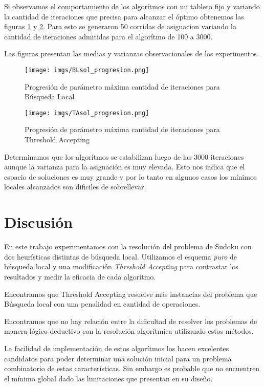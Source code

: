 \documentclass[a4paper,spanish]{article}
\begin{document}
Si observamos el comportamiento de los algorítmos con un tablero fijo y variando
la cantidad de iteraciones que precisa para alcanzar el óptimo obtenemos las
figuras \ref{img:prog_ls} y \ref{img:prog_ta}. Para esto se generaron 50
corridas de asignacion variando la cantidad de iteraciones admitidas para el
algorítmo de 100 a 3000.

Las figuras presentan las medias y varianzas observacionales de los
experimentos.


\begin{center}
    \begin{figure}[H]
        \texttt{[image: imgs/BLsol\_progresion.png]}
        \caption{Progresión de parámetro máxima cantidad de iteraciones para Búsqueda Local}
        \label{img:prog_ls}
    \end{figure}
\end{center}


\begin{center}
    \begin{figure}[H]
        \texttt{[image: imgs/TAsol\_progresion.png]}
        \caption{Progresión de parámetro máxima cantidad de iteraciones para
        Threshold Accepting}
        \label{img:prog_ta}
    \end{figure}
\end{center}

Determinamos que los algorítmos se estabilizan luego de las 3000 iteraciones
aunque la varianza para la asignación es muy elevada. Esto nos indica que el
espacio de soluciones es muy grande y por lo tanto en algunos casos los mínimos locales
alcanzados son dificiles de sobrellevar.



\section{Discusión}

En este trabajo experimentamos con la resolución del problema de Sudoku con dos
heurísticas distintas de búsqueda local. Utilizamos el esquema \textit{puro} de
búsqueda local y una modificación \emph{Threshold Accepting} para contrastar los
resultados y medir la eficacia de cada algorítmo.

Encontramos que Threshold Accepting resuelve más instancias del problema que
Búsqueda local con una penalidad en cantidad de operaciones.

Encontramos que no hay relación entre la dificultad de resolver los problemas de
manera lógico deductivo con la resolución algorítmica utilizando estos métodos.

La facilidad de implementación de estos algorítmos los hacen excelentes
candidatos para poder determinar una solución inicial para un problema
combinatorio de estas características. Sin embargo es probable que no encuentren
el mínimo global dado las limitaciones que presentan en su diseño.



\end{document}
